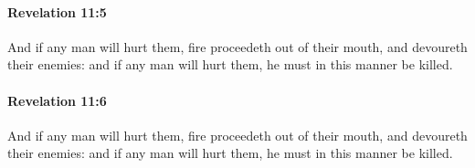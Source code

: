 		\paragraph{Revelation 11:5} %
			\label{REVELATIONNT-11-5}

			And if any man will hurt them, fire proceedeth out of their mouth, and devoureth their enemies: and if any man will hurt them, he must in this manner be killed.

			\begin{framed}
			\scriptsize
				\begin{compactdesc}
					\item[SBLG] 
				\end{compactdesc}
			\end{framed}

		\paragraph{Revelation 11:6} %
			\label{REVELATIONNT-11-6}

			And if any man will hurt them, fire proceedeth out of their mouth, and devoureth their enemies: and if any man will hurt them, he must in this manner be killed.

